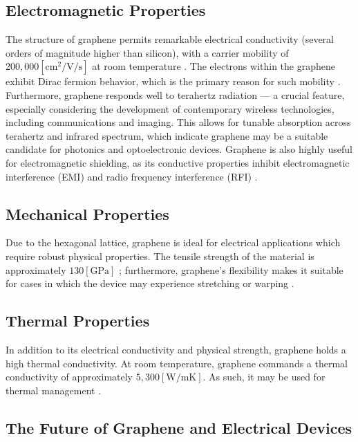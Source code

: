 \documentclass[conference]{IEEEtran}
\begin{document}
\subsection{Electromagnetic Properties}

The structure of graphene permits remarkable electrical conductivity (several orders of magnitude higher than silicon), with a carrier mobility of $200,000\left[ \si{\cm\squared\per\volt\per\second} \right]$ at room temperature \cite{mb3}. The electrons within the graphene exhibit Dirac fermion behavior, which is the primary reason for such mobility \cite{mb4}. Furthermore, graphene responds well to terahertz radiation — a crucial feature, especially considering the development of contemporary wireless technologies, including communications and imaging. This allows for tunable absorption across terahertz and infrared spectrum, which indicate graphene may be a suitable candidate for photonics and optoelectronic devices. Graphene is also highly useful for electromagnetic shielding, as its conductive properties inhibit electromagnetic interference (EMI) and radio frequency interference (RFI) \cite{mb5}.

\subsection{Mechanical Properties}

Due to the hexagonal lattice, graphene is ideal for electrical applications which require robust physical properties. The tensile strength of the material is approximately $130[\si{\giga\pascal}]$ \cite{mb6}; furthermore, graphene's flexibility makes it suitable for cases in which the device may experience stretching or warping \cite{mb7}.

\subsection{Thermal Properties}

In addition to its electrical conductivity and physical strength, graphene holds a high thermal conductivity. At room temperature, graphene commands a thermal conductivity of approximately $5,300[\si{\watt\per\milli\kelvin}]$. As such, it may be used for thermal management \cite{mb8}.

\subsection{The Future of Graphene and Electrical Devices}
\end{document}
